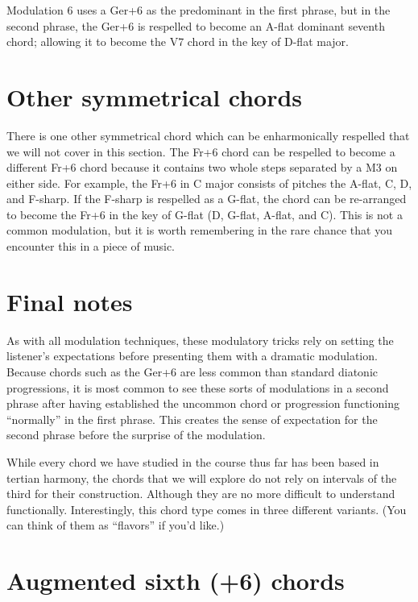 \documentclass{book}
\begin{document}
Modulation 6 uses a Ger+6 as the predominant in the first phrase, but in the
second phrase, the Ger+6 is respelled to become an A-flat dominant seventh
chord; allowing it to become the V7 chord in the key of D-flat major.

\hypertarget{other-symmetrical-chords}{%
\section{Other symmetrical chords}\label{other-symmetrical-chords}}

There is one other symmetrical chord which can be enharmonically respelled
that we will not cover in this section. The Fr+6 chord can be respelled to
become a different Fr+6 chord because it contains two whole steps separated by
a M3 on either side. For example, the Fr+6 in C major consists of pitches the
A-flat, C, D, and F-sharp. If the F-sharp is respelled as a G-flat, the chord
can be re-arranged to become the Fr+6 in the key of G-flat (D, G-flat, A-flat,
and C). This is not a common modulation, but it is worth remembering in the
rare chance that you encounter this in a piece of music.

\hypertarget{final-notes}{%
\section{Final notes}\label{final-notes}}

As with all modulation techniques, these modulatory tricks rely on setting the
listener's expectations before presenting them with a dramatic modulation.
Because chords such as the Ger+6 are less common than standard diatonic
progressions, it is most common to see these sorts of modulations in a second
phrase after having established the uncommon chord or progression functioning
``normally'' in the first phrase. This creates the sense of expectation for
the second phrase before the surprise of the modulation.

While every chord we have studied in the course thus far has been based in
tertian harmony, the chords that we will explore do not rely on intervals of
the third for their construction. Although they are no more difficult to
understand functionally. Interestingly, this chord type comes in three
different variants. (You can think of them as ``flavors'' if you'd like.)

\hypertarget{augmented-sixth-6-chords}{%
\section{Augmented sixth (+6) chords}\label{augmented-sixth-6-chords}}
\end{document}

